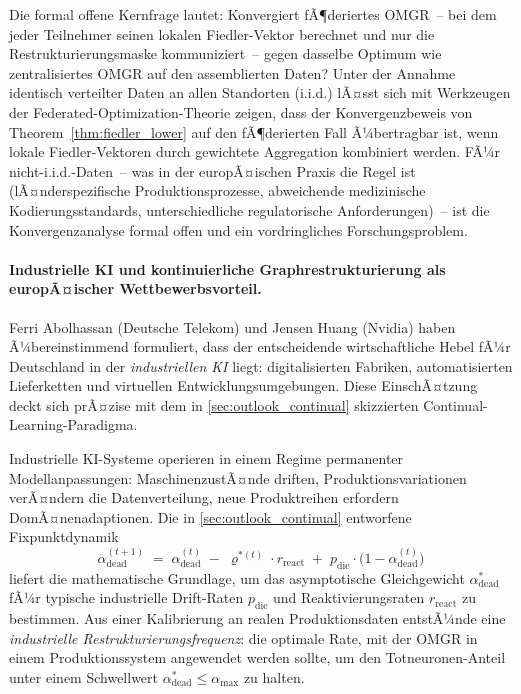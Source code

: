﻿\documentclass[12pt, a4paper, openany]{report}
\begin{document}
Die formal offene Kernfrage lautet: Konvergiert fÃ¶deriertes
OMGR~-- bei dem jeder Teilnehmer seinen lokalen Fiedler-Vektor
berechnet und nur die Restrukturierungsmaske kommuniziert~-- gegen
dasselbe Optimum wie zentralisiertes OMGR auf den assemblierten Daten?
Unter der Annahme identisch verteilter Daten an allen Standorten
(i.i.d.) lÃ¤sst sich mit Werkzeugen der Federated-Optimization-Theorie
zeigen, dass der Konvergenzbeweis von Theorem~\ref{thm:fiedler_lower}
auf den fÃ¶derierten Fall Ã¼bertragbar ist, wenn lokale Fiedler-Vektoren
durch gewichtete Aggregation kombiniert werden.  FÃ¼r
nicht-i.i.d.-Daten~-- was in der europÃ¤ischen Praxis die Regel ist
(lÃ¤nderspezifische Produktionsprozesse, abweichende medizinische
Kodierungsstandards, unterschiedliche regulatorische Anforderungen)~--
ist die Konvergenzanalyse formal offen und ein vordringliches
Forschungsproblem.

\paragraph{Industrielle KI und kontinuierliche Graphrestrukturierung
  als europÃ¤ischer Wettbewerbsvorteil.}
Ferri Abolhassan (Deutsche Telekom) und Jensen Huang (Nvidia) haben
Ã¼bereinstimmend formuliert, dass der entscheidende wirtschaftliche
Hebel fÃ¼r Deutschland in der \emph{industriellen KI} liegt:
digitalisierten Fabriken, automatisierten Lieferketten und virtuellen
Entwicklungsumgebungen.  Diese EinschÃ¤tzung deckt sich prÃ¤zise mit dem
in \cref{sec:outlook_continual} skizzierten Continual-Learning-Paradigma.

Industrielle KI-Systeme operieren in einem Regime permanenter
Modellanpassungen: MaschinenzustÃ¤nde driften, Produktionsvariationen
verÃ¤ndern die Datenverteilung, neue Produktreihen erfordern
DomÃ¤nenadaptionen.  Die in \cref{sec:outlook_continual} entworfene
Fixpunktdynamik
\[
  \alpha_{\mathrm{dead}}^{(t+1)}
  \;=\;
  \alpha_{\mathrm{dead}}^{(t)}
  \;-\; \varrho^{*(t)} \cdot r_{\mathrm{react}}
  \;+\; p_{\mathrm{die}} \cdot \bigl(1 - \alpha_{\mathrm{dead}}^{(t)}\bigr)
\]
liefert die mathematische Grundlage, um das asymptotische Gleichgewicht
$\alpha^*_{\mathrm{dead}}$ fÃ¼r typische industrielle Drift-Raten
$p_{\mathrm{die}}$ und Reaktivierungsraten $r_{\mathrm{react}}$ zu
bestimmen.  Aus einer Kalibrierung an realen Produktionsdaten entstÃ¼nde
eine \emph{industrielle Restrukturierungsfrequenz}: die optimale Rate,
mit der OMGR in einem Produktionssystem angewendet werden sollte, um
den Totneuronen-Anteil unter einem Schwellwert
$\alpha^*_{\mathrm{dead}} \leq \alpha_{\max}$ zu halten.
\end{document}
